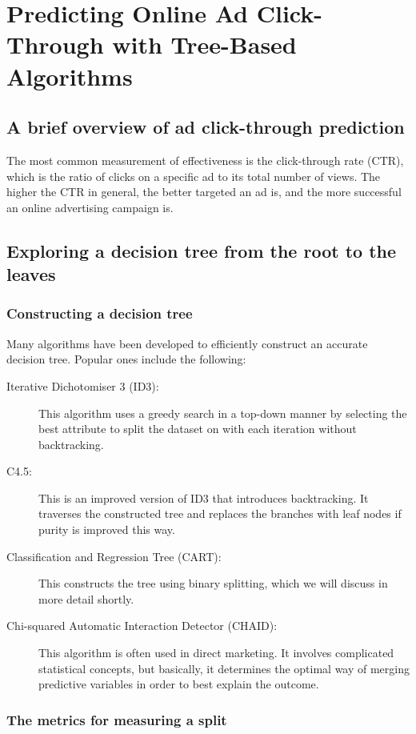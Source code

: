 \chapter{Predicting Online Ad Click-Through with Tree-Based Algorithms\label{Ch04}}
\section{A brief overview of ad click-through prediction}
The most common measurement of effectiveness is the click-through rate (CTR), which is the ratio of clicks on a specific ad to its total number of views. The higher the CTR in general, the better targeted an ad is, and the more successful an online advertising campaign is.
\section{Exploring a decision tree from the root to the leaves}
\subsection{Constructing a decision tree}
Many algorithms have been developed to efficiently construct an accurate decision tree. Popular ones include the following:

\begin{description}
    \item[Iterative Dichotomiser 3 (ID3):]This algorithm uses a greedy search in a top-down manner by selecting the best attribute to split the dataset on with each iteration without backtracking.
    \item[C4.5:]This is an improved version of ID3 that introduces backtracking. It traverses the constructed tree and replaces the branches with leaf nodes if purity is improved this way.
    \item[Classification and Regression Tree (CART):]This constructs the tree using binary splitting, which we will discuss in more detail shortly.
    \item[Chi-squared Automatic Interaction Detector (CHAID):]This algorithm is often used in direct marketing. It involves complicated statistical concepts, but basically, it determines the optimal way of merging predictive variables in order to best explain the outcome.
\end{description}

\subsection{The metrics for measuring a split}
